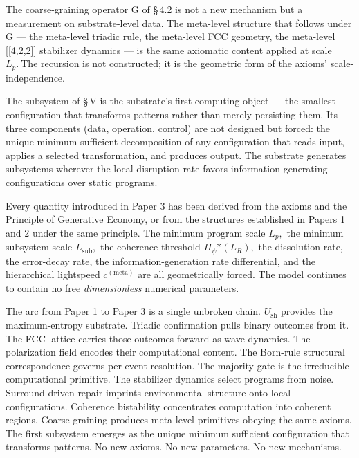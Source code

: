 \documentclass[11pt,oneside]{report}
\theoremstyle{definition}
\theoremstyle{remark}
\begin{document}
The coarse-graining operator G of \S\,4.2 is not a new mechanism but a
measurement on substrate-level data. The meta-level structure that
follows under G --- the meta-level triadic rule, the meta-level FCC
geometry, the meta-level [[4,2,2]] stabilizer dynamics --- is
the same axiomatic content applied at scale \ensuremath{L_{p}.~\text{The}} recursion is not
constructed; it is the geometric form of the axioms' scale-independence.

The subsystem of \S\,V is the substrate's first computing object --- the
smallest configuration that transforms patterns rather than merely
persisting them. Its three components (data, operation, control) are not
designed but forced: the unique minimum sufficient decomposition of any
configuration that reads input, applies a selected transformation, and
produces output. The substrate generates subsystems wherever the local
disruption rate favors information-generating configurations over static
programs.

Every quantity introduced in Paper 3 has been derived from the axioms
and the Principle of Generative Economy, or from the structures
established in Papers 1 and 2 under the same principle. The minimum
program scale \ensuremath{L_{p},} the minimum subsystem scale \ensuremath{L_{\mathrm{sub}},} the coherence
threshold \textbar \ensuremath{\Pi_{\psi}}\textbar\ensuremath{*(L_{R}),} the dissolution rate, the
error-decay rate, the information-generation rate differential, and the
hierarchical lightspeed \ensuremath{c^{(\text{meta})}} are all geometrically forced. The
model continues to contain no free \emph{dimensionless} numerical parameters.

The arc from Paper 1 to Paper 3 is a single unbroken chain. \ensuremath{U_{\mathrm{sh}}} provides
the maximum-entropy substrate. Triadic confirmation pulls binary
outcomes from it. The FCC lattice carries those outcomes forward as wave
dynamics. The polarization field encodes their computational content.
The Born-rule structural correspondence governs per-event resolution.
The majority gate is the irreducible computational primitive. The
stabilizer dynamics select programs from noise. Surround-driven repair
imprints environmental structure onto local configurations. Coherence
bistability concentrates computation into coherent regions.
Coarse-graining produces meta-level primitives obeying the same axioms.
The first subsystem emerges as the unique minimum sufficient
configuration that transforms patterns. No new axioms. No new
parameters. No new mechanisms.
\end{document}
